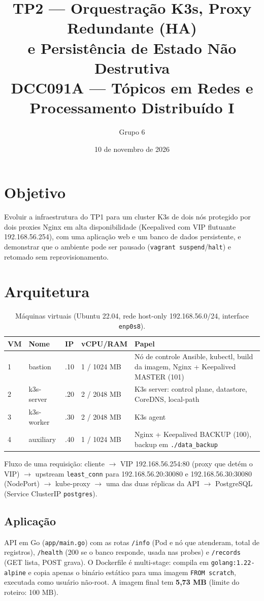 \documentclass[11pt,a4paper]{article}
\title{\textbf{TP2 --- Orquestração K3s, Proxy Redundante (HA)\\e Persistência de Estado Não Destrutiva}\\[4pt]
\large DCC091A --- Tópicos em Redes e Processamento Distribuído I}
\author{Grupo 6}
\date{10 de novembro de 2026}
\begin{document}
\maketitle

\section{Objetivo}
Evoluir a infraestrutura do TP1 para um cluster K3s de dois nós protegido por dois proxies
Nginx em alta disponibilidade (Keepalived com VIP flutuante 192.168.56.254), com uma
aplicação web e um banco de dados persistente, e demonstrar que o ambiente pode ser
pausado (\texttt{vagrant suspend}/\texttt{halt}) e retomado sem reprovisionamento.

\section{Arquitetura}

\begin{table}[h]
\centering
\begin{tabularx}{\textwidth}{llllX}
\toprule
VM & Nome & IP & vCPU/RAM & Papel \\
\midrule
1 & bastion    & .10 & 1 / 1024 MB & Nó de controle Ansible, kubectl, build da imagem, Nginx + Keepalived MASTER (101) \\
2 & k3s-server & .20 & 2 / 2048 MB & K3s server: control plane, datastore, CoreDNS, local-path \\
3 & k3s-worker & .30 & 2 / 2048 MB & K3s agent \\
4 & auxiliary  & .40 & 1 / 1024 MB & Nginx + Keepalived BACKUP (100), backup em \texttt{./data\_backup} \\
\bottomrule
\end{tabularx}
\caption{Máquinas virtuais (Ubuntu 22.04, rede host-only 192.168.56.0/24, interface \texttt{enp0s8}).}
\end{table}

Fluxo de uma requisição: cliente $\rightarrow$ VIP 192.168.56.254:80 (proxy que detém o VIP)
$\rightarrow$ upstream \texttt{least\_conn} para 192.168.56.20:30080 e 192.168.56.30:30080
(NodePort) $\rightarrow$ kube-proxy $\rightarrow$ uma das duas réplicas da API $\rightarrow$
PostgreSQL (Service ClusterIP \texttt{postgres}).

\subsection{Aplicação}
API em Go (\texttt{app/main.go}) com as rotas \texttt{/info} (Pod e nó que atenderam, total
de registros), \texttt{/health} (200 se o banco responde, usada nas probes) e
\texttt{/records} (GET lista, POST grava). O Dockerfile é multi-stage: compila em
\texttt{golang:1.22-alpine} e copia apenas o binário estático para uma imagem
\texttt{FROM scratch}, executada como usuário não-root. A imagem final tem
\textbf{5,73 MB} (limite do roteiro: 100 MB).
\end{document}

